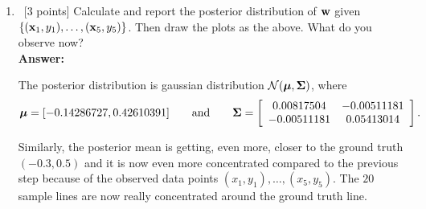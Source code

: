 \documentclass[12pt, fullpage,letterpaper]{article}
\def\red{\color{red}}
\def\blackblue{\color{black!40!blue}}
\begin{document}
\begin{enumerate}
\begin{enumerate}
{		
	}
		\item~[3 points] Calculate and report the posterior distribution of ${\bf w}$ given $\{({\bf x}_1, y_1), \ldots, ({\bf x}_5, y_5)\}$. Then draw the plots as the above. What do you observe now? \\
	{\bf \red Answer:} {\blackblue 
	The posterior distribution is gaussian distribution $\mathcal{N}(\boldsymbol{\mu}, \boldsymbol{\Sigma})$, where 
	$$\boldsymbol{\mu} =  [-0.14286727, 0.42610391]\quad\quad\text{and}\quad \quad \boldsymbol{\Sigma} = \left[\begin{array}{cc}0.00817504 & -0.00511181\\
	-0.00511181 & 0.05413014
	\end{array}\right].$$
		
	Similarly, the posterior mean is getting, even more, closer to the ground truth $(-0.3,0.5)$ and it is now even more concentrated compared to the previous step because of the observed data points $(x_1,y_1),\ldots, (x_5,y_5)$. The $20$ sample lines are now really concentrated around the ground truth line.	
	
}
\end{enumerate}
\end{enumerate}
\end{document}
